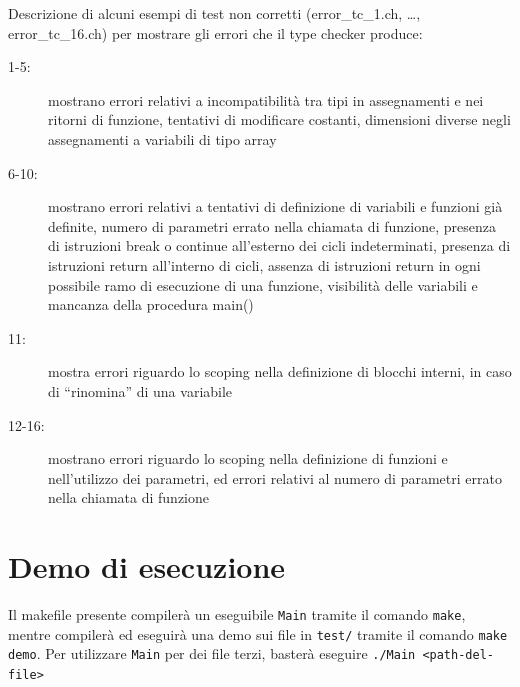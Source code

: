 \documentclass{report}
\newcommand{\term}[1]{\texttt{#1}}
\begin{document}
Descrizione di alcuni esempi di test non corretti (error\_tc\_1.ch, …, error\_tc\_16.ch) per mostrare 
gli errori che il type checker produce:
\begin{description}
    \item[1-5:] mostrano errori relativi a incompatibilità tra tipi in assegnamenti e nei ritorni di funzione,
        tentativi di modificare costanti, dimensioni diverse negli assegnamenti a variabili di tipo array
    
    \item[6-10:] mostrano errori relativi a tentativi di definizione di variabili e funzioni già definite,
        numero di parametri errato nella chiamata di funzione, presenza di istruzioni break o continue
        all'esterno dei cicli indeterminati, presenza di istruzioni return all'interno di cicli,
        assenza di istruzioni return in ogni possibile ramo di esecuzione di una funzione,
        visibilità delle variabili e mancanza della procedura main()

    \item[11:] mostra errori riguardo lo scoping nella definizione di blocchi interni, in caso di ``rinomina''
        di una variabile
    
    \item[12-16:] mostrano errori riguardo lo scoping nella definizione di funzioni e nell'utilizzo
        dei parametri, ed errori relativi al numero di parametri errato nella chiamata di funzione

\end{description}


\section {Demo di esecuzione}

Il makefile presente compilerà un eseguibile \term{Main} tramite il comando \term{make}, mentre
compilerà ed eseguirà una demo sui file in \term{test/} tramite il comando \term{make demo}.
Per utilizzare \term{Main} per dei file terzi, basterà eseguire \term{./Main <path-del-file>}
\end{document}
